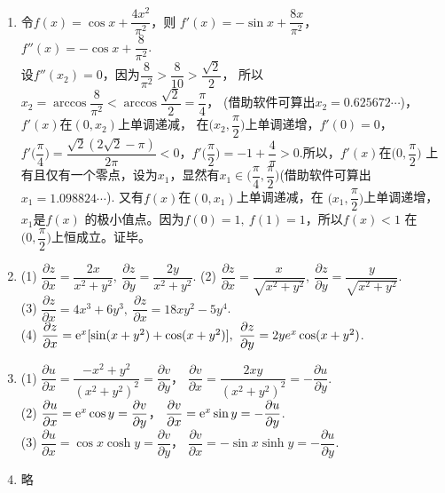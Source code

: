\begin{enumerate}[label={\textbf{\arabic*.}},leftmargin=
    \inteval{\myenumleftmargin}pt]
\item 
令$ f(x)=\cos x+\dfrac{4x^2}{\pi^2} $，则
$ f'(x) =-\sin x+\dfrac{8x}{\pi^2} $，
$ f''(x)=-\cos x+\dfrac{8}{\pi^2} $.\\
设$ f''(x_2)=0 $，因为$ \dfrac{8}{\pi^2}>\dfrac{8}{10}>\dfrac{\sqrt{2}}{2} $，
所以$ x_2=\arccos\dfrac{8}{\pi^2}<\arccos\dfrac{\sqrt{2}}{2}=\dfrac{\pi}{4} $，
(借助软件可算出$ x_2=0.625672\cdots $)，$ f'(x) $在$ (0,x_2) $上单调递减，
在$ \Big(x_2,\dfrac{\pi}{2}\Big) $上单调递增，$ f'(0)=0 $，
$ f'\Big(\dfrac{\pi}{4}\Big)
=\dfrac{\sqrt{2}(2\sqrt{2}-\pi)}{2\pi}<0 $，$ f'\Big(\dfrac{\pi}{2}\Big)
=-1+\dfrac{4}{\pi}>0 $.所以，$ f'(x) $在$ \big(0,\dfrac{\pi}{2}\big) $
上有且仅有一个零点，设为$ x_1 $，显然有$ x_1\in\Big(\dfrac{\pi}{4},
\dfrac{\pi}{2}\Big) $(借助软件可算出$ x_1=1.098824\cdots $).
又有$ f(x) $在$ (0,x_1) $上单调递减，在
$ \Big(x_1,\dfrac{\pi}{2}\Big) $上单调递增，$ x_1 $是$ f(x) $
的极小值点。因为$ f(0)=1,\ f(1)=1 $，所以$ f(x)<1 $
在$ \Big(0,\dfrac{\pi}{2}\Big) $上恒成立。证毕。

\item 
(1) $ \dfrac{\partial z}{\partial x}=\dfrac{2x}{x^2+y^2},\ 
\dfrac{\partial z}{\partial y}=\dfrac{2y}{x^2+y^2} $. \quad
(2) $ \dfrac{\partial z}{\partial x}=\dfrac{x}{\sqrt{x^2+y^2}},\ 
\dfrac{\partial z}{\partial y}=\dfrac{y}{\sqrt{x^2+y^2}} $. \\
(3) $ \dfrac{\partial z}{\partial x}=4x^3+6y^3,\ 
\dfrac{\partial z}{\partial x}=18xy^2-5y^4 $. \\
(4) $ \dfrac{\partial z}{\partial x}=\e^x[\sin(x+y^2)+\cos(x+y^2)],\ 
\dfrac{\partial z}{\partial y}=2ye^x \cos(x+y^2) $. 

\item (1) $ \dfrac{\partial u}{\partial x} =
\dfrac{-x^2+y^2}{(x^2+y^2)^2}=\dfrac{\partial v}{\partial y} $，
$ \dfrac{\partial v}{\partial x} =\dfrac{2xy}{(x^2+y^2)^2}=
-\dfrac{\partial u}{\partial y} $. \\
(2) $ \dfrac{\partial u}{\partial x} =\mathrm{e}^x \cos y=
\dfrac{\partial v}{\partial y} $，
$ \dfrac{\partial v}{\partial x} =\mathrm{e}^x \sin y=
-\dfrac{\partial u}{\partial y} $. \\
(3) $ \dfrac{\partial u}{\partial x} =\cos x\cosh y=
\dfrac{\partial v}{\partial y} $，
$ \dfrac{\partial v}{\partial x} = -\sin x\sinh y=
-\dfrac{\partial u}{\partial y} $. 

\item 略

\end{enumerate}
\myfootnote{\CopyrightStatementChap}
\cleardoublepage



